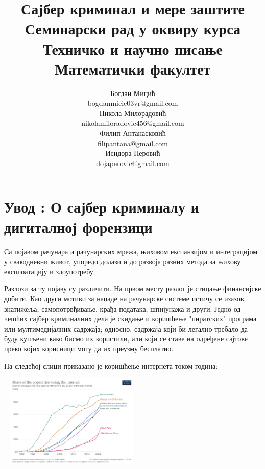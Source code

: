 \documentclass[a4paper]{article}
\begin{document}
	\title{Сајбер криминал и мере заштите\\ \small{Семинарски рад у оквиру курса Техничко и научно писање\\ Математички факултет}}
	
	\author{Богдан Мицић\\ bogdanmicic03vr@gmail.com\\ Никола Милорадовић\\ nikolamiloradovic456@gmail.com\\ Филип Антанасковић\\ filipantana@gmail.com\\ Исидора Перовић\\ dojaperovic@gmail.com} 
	\maketitle
	\tableofcontents
	\newpage
	
	\section{Увод : О сајбер криминалу и дигиталној форензици}
         \label{sec:Uvod}
        Са појавом рачунара и рачунарских мрежа, њиховом експанзијом и интеграцијом у свакодневни живот, упоредо долази и до развоја разних метода за њихову експлоатацију и злоупотребу.

        Разлози за ту појаву су различити. На првом месту разлог је стицање финансијске добити. Као други мотиви за нападе на рачунарске системе истичу се 
        изазов, знатижеља, самопотрвђивање, крађа података, шпијунажа и други. Једно од чешћих сајбер криминалних дела је скидање и коришћење "пиратских" програма или мултимедијалних садржаја; односно, садржаја који би легално требало да буду купљени како бисмо их користили, али који се ставе на одређене сајтове преко којих корисници могу да их преузму бесплатно.

        На следећој слици приказано је коришћење интернета током година:\cite{slikaKoriscenjeInterneta}

        \begin{center}
        \includegraphics[width=7cm, height=4.5cm]{koriscenje-interneta-po-godinama.png}
        \end{center}
        
\end{document}
